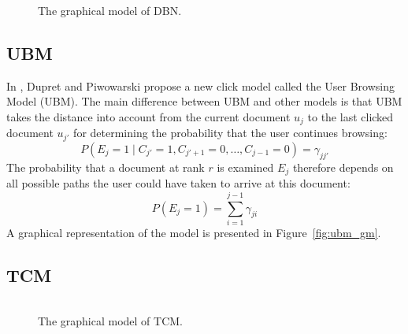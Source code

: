 \begin{figure}[ht!]
	\begin{center}
		\begin{tabular}{c}
			
		\end{tabular}
	\end{center}
	\caption{The graphical model of DBN.}	
	\label{fig:dbn_gm}
\end{figure}

\subsection{UBM}
In \cite{Dupret2008}, Dupret and Piwowarski propose a new click model called the User Browsing Model (UBM). The main difference between UBM and other models is that UBM takes the distance into account from the current document \(u_j\) to the last clicked document \(u_{j'}\) for determining the probability that the user continues browsing:
\[P(E_j =1 \mid C_{j'}=1, C_{j'+1}=0, \dots, C_{j-1}=0) = \gamma_{jj'}\]
The probability that a document at rank \(r\) is examined \(E_j\) therefore depends on all possible paths the user could have taken to arrive at this document:
\[P(E_j = 1) = \sum_{i=1}^{j-1} \gamma_{ji}\]
A graphical representation of the model is presented in Figure~\ref{fig:ubm_gm}.

\subsection{TCM}
\begin{figure}[ht]
  \begin{center}
    \begin{tabular}{c}
      
    \end{tabular}
  \end{center}
  \caption{The graphical model of TCM.}
  \label{fig:tcm_gm}
\end{figure}
